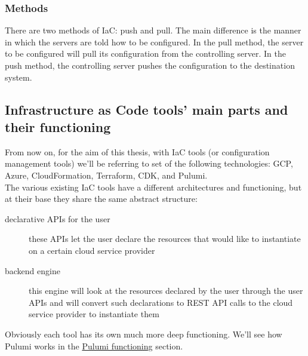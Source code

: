 \subsubsection{Methods}

There are two methods of IaC: push and pull.
The main difference is the manner in which the servers are told how to be configured.
In the pull method, the server to be configured will pull its configuration from the controlling server.
In the push method, the controlling server pushes the configuration to the destination system.

\subsection{Infrastructure as Code tools' main parts and their functioning}
From now on, for the aim of this thesis, with IaC tools (or configuration management tools) we'll be referring to set of the following technologies: \gls{GCP}, \gls{Azure}, \gls{CloudFormation}, \gls{Terraform}, \gls{CDK}, and Pulumi.\\
The various existing IaC tools have a different architectures and functioning, but at their base they share the same abstract structure:
\begin{description}
  \item[declarative APIs for the user] these APIs let the user declare the resources that would like to instantiate on a certain cloud service provider
  \item[backend engine] this engine will look at the resources declared by the user through the user APIs and will convert such declarations to REST API calls to the cloud service provider to instantiate them 
\end{description}
Obviously each tool has its own much more deep functioning.
We'll see how Pulumi works in the \hyperref[sec:pulumi-functioning]{Pulumi functioning} section.



